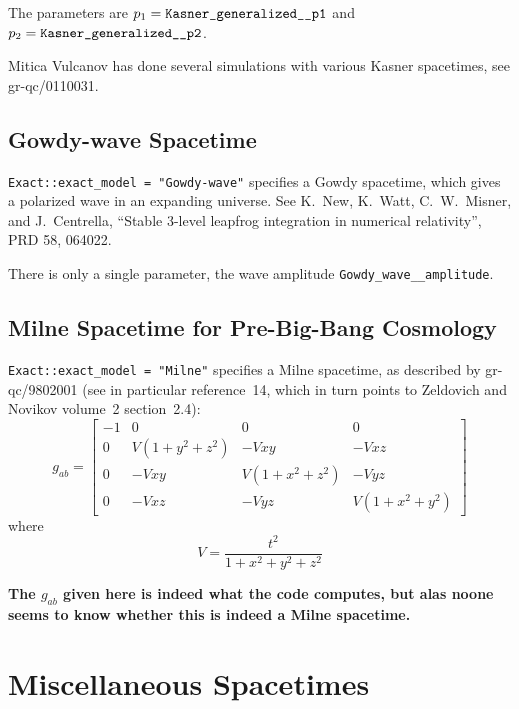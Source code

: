 The parameters are $p_1 = \verb|Kasner_generalized__p1|$
and $p_2 = \verb|Kasner_generalized__p2|$.

Mitica Vulcanov has done several simulations with various Kasner
spacetimes, see gr-qc/0110031. 


\subsection{Gowdy-wave Spacetime}

\verb|Exact::exact_model = "Gowdy-wave"| specifies a Gowdy spacetime,
which gives a polarized wave in an expanding universe.  See
K.~New, K.~Watt, C.~W.~Misner, and J.~Centrella,
``Stable 3-level leapfrog integration in numerical relativity'',
PRD 58, 064022.

There is only a single parameter, the wave amplitude
\verb|Gowdy_wave__amplitude|.


\subsection{Milne Spacetime for Pre-Big-Bang Cosmology}

\verb|Exact::exact_model = "Milne"| specifies a Milne spacetime,
as described by gr-qc/9802001 (see in particular reference~14, which
in turn points to Zeldovich and Novikov volume~2 section~2.4):
\begin{equation}
g_{ab} = \left[
	 \begin{array}{cccc}
	 -1	& 0		& 0		& 0		\\
	 0	& V(1+y^2+z^2)	& -Vxy		& -Vxz		\\
	 0	& -Vxy		& V(1+x^2+z^2)	& -Vyz		\\
	 0	& -Vxz		& -Vyz		& V(1+x^2+y^2)	%
	 \end{array}
	 \right]
\end{equation}
where
\begin{equation}
V = \frac{t^2}{1 + x^2 + y^2 + z^2}
\end{equation}

{\bf The $g_{ab}$ given here is indeed what the code computes, but
alas noone seems to know whether this is indeed a Milne  spacetime.}


\section{Miscellaneous Spacetimes}

